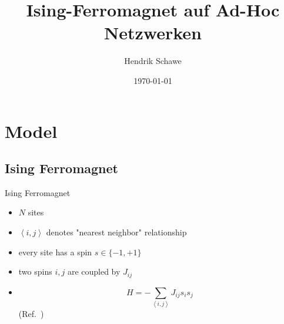 \documentclass{beamer}
\title{Ising-Ferromagnet auf Ad-Hoc Netzwerken}
\author{Hendrik Schawe}
\date{\today}
\newcommand{\avg}[1]{\left< #1 \right>}
\begin{document}
\maketitle
\frame{\tableofcontents[pausesections]}

\section{Model}
    \subsection{Ising Ferromagnet}
        \begin{frame}{Ising Ferromagnet}
            \begin{itemize}[<+->]
                \item \(N\) sites
                \item \(\avg{i,j}\) denotes "nearest neighbor" relationship
                \item every site has a spin \(s \in \{-1,+1\}\)
                \item two spins \(i,j\) are coupled by \(J_{ij}\)
                \item{
                    \begin{equation}
                        H = - \sum_{\avg{i,j}}J_{ij}s_{i}s_{j}
                    \end{equation}
                    (Ref.\ \cite{Ising1925})
                }
            \end{itemize}
        \end{frame}
\end{document}

